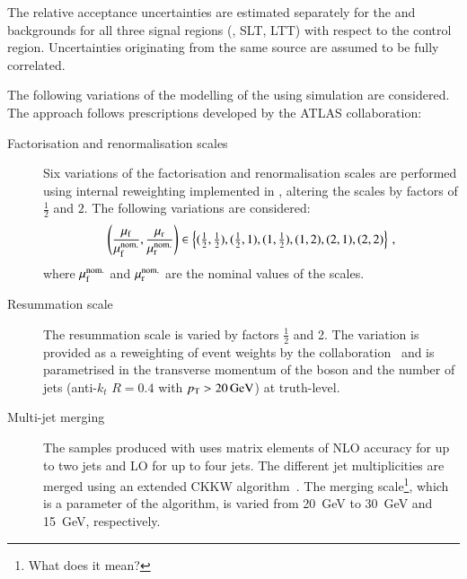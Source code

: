 

The relative acceptance uncertainties are estimated separately for the
\ZHF and \ttbar backgrounds for all three signal regions (\hadhad,
\lephad SLT, \lephad LTT) with respect to the \ZHF control
region. Uncertainties originating from the same source are assumed to
be fully correlated.

The following variations of the modelling of the \ZHF using simulation
are considered. The approach follows prescriptions developed by the
ATLAS collaboration:
\begin{description}
\item[Factorisation and renormalisation scales] Six variations of the
factorisation and renormalisation scales are performed using
  internal reweighting implemented in \SHERPA[2.2.1], altering the
  scales by factors of $\frac{1}{2}$ and $2$. The following variations
  are considered:
  \begin{align*}
    \left( \frac{\mu_\mathrm{f}}{\mu_\mathrm{f}^{\text{nom.}}}, \frac{\mu_\mathrm{r}}{\mu_\mathrm{r}^{\text{nom.}}} \right) \in
    \left\{ (\tfrac{1}{2}, \tfrac{1}{2}), (\tfrac{1}{2}, 1), (1, \tfrac{1}{2}), (1, 2), (2, 1), (2, 2) \right\} \,\text{,}
  \end{align*}
  where $\mu_\mathrm{f}^{\text{nom.}}$ and $\mu_\mathrm{r}^{\text{nom.}}$ are the nominal
  values of the scales.

\item[Resummation scale] The resummation scale 
  is varied by factors $\frac{1}{2}$ and 2. The variation is provided
  as a reweighting of event weights by the
  collaboration~\cite{anders:2017} and is parametrised in the
  transverse momentum of the \PZ boson and the number of jets
  (anti-$k_{t}$ $R = 0.4$ with $\pT > \SI{20}{\GeV}$) at truth-level.

\item[Multi-jet merging] The \Vjets samples produced with
  \SHERPA[2.2.1] uses matrix elements of NLO accuracy for up to two
  jets and LO for up to four jets. The different jet multiplicities
  are merged using an extended CKKW
  algorithm~\cite{Catani:2001cc,Hoeche:2009rj}. The merging
  scale\footnote{What does it mean?}, which is a parameter of the
  algorithm, is varied from \SI{20}{\GeV} to \SI{30}{\GeV} and
  \SI{15}{\GeV}, respectively.


\end{description}
